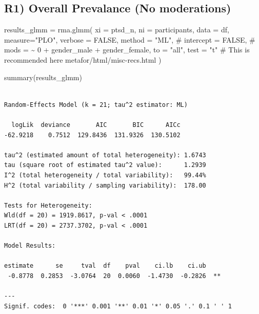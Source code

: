 \documentclass[
  letterpaper,
  DIV=11,
  numbers=noendperiod]{scrartcl}
\newenvironment{Shaded}{\begin{snugshade}}{\end{snugshade}}
\newcommand{\AttributeTok}[1]{\textcolor[rgb]{0.40,0.45,0.13}{#1}}
\newcommand{\CommentTok}[1]{\textcolor[rgb]{0.37,0.37,0.37}{#1}}
\newcommand{\ConstantTok}[1]{\textcolor[rgb]{0.56,0.35,0.01}{#1}}
\newcommand{\FunctionTok}[1]{\textcolor[rgb]{0.28,0.35,0.67}{#1}}
\newcommand{\NormalTok}[1]{\textcolor[rgb]{0.00,0.23,0.31}{#1}}
\newcommand{\OtherTok}[1]{\textcolor[rgb]{0.00,0.23,0.31}{#1}}
\newcommand{\StringTok}[1]{\textcolor[rgb]{0.13,0.47,0.30}{#1}}
\begin{document}
\subsection{R1) Overall Prevalance (No
moderations)}\label{r1-overall-prevalance-no-moderations}

\begin{Shaded}
\begin{Highlighting}[]
\NormalTok{results\_glmm }\OtherTok{=} \FunctionTok{rma.glmm}\NormalTok{(}
  \AttributeTok{xi =} \StringTok{\textasciigrave{}}\AttributeTok{ptsd\_n}\StringTok{\textasciigrave{}}\NormalTok{, }
  \AttributeTok{ni =} \StringTok{\textasciigrave{}}\AttributeTok{participants}\StringTok{\textasciigrave{}}\NormalTok{, }
  \AttributeTok{data =}\NormalTok{ df, }
  \AttributeTok{measure=}\StringTok{"PLO"}\NormalTok{,}
  \AttributeTok{verbose =} \ConstantTok{FALSE}\NormalTok{,}
  \AttributeTok{method =} \StringTok{"ML"}\NormalTok{,}
  \CommentTok{\# intercept = FALSE,}
  \CommentTok{\# mods = \textasciitilde{} 0 + gender\_male + gender\_female,}
  \AttributeTok{to =} \StringTok{"all"}\NormalTok{,}
  \AttributeTok{test =} \StringTok{"t"} \CommentTok{\# This is recommended here metafor/html/misc{-}recs.html}
\NormalTok{)}

\FunctionTok{summary}\NormalTok{(results\_glmm)}
\end{Highlighting}
\end{Shaded}

\begin{verbatim}

Random-Effects Model (k = 21; tau^2 estimator: ML)

  logLik  deviance       AIC       BIC      AICc   
-62.9218    0.7512  129.8436  131.9326  130.5102   

tau^2 (estimated amount of total heterogeneity): 1.6743
tau (square root of estimated tau^2 value):      1.2939
I^2 (total heterogeneity / total variability):   99.44%
H^2 (total variability / sampling variability):  178.00

Tests for Heterogeneity:
Wld(df = 20) = 1919.8617, p-val < .0001
LRT(df = 20) = 2737.3702, p-val < .0001

Model Results:

estimate      se     tval  df    pval    ci.lb    ci.ub     
 -0.8778  0.2853  -3.0764  20  0.0060  -1.4730  -0.2826  ** 

---
Signif. codes:  0 '***' 0.001 '**' 0.01 '*' 0.05 '.' 0.1 ' ' 1
\end{verbatim}
\end{document}
